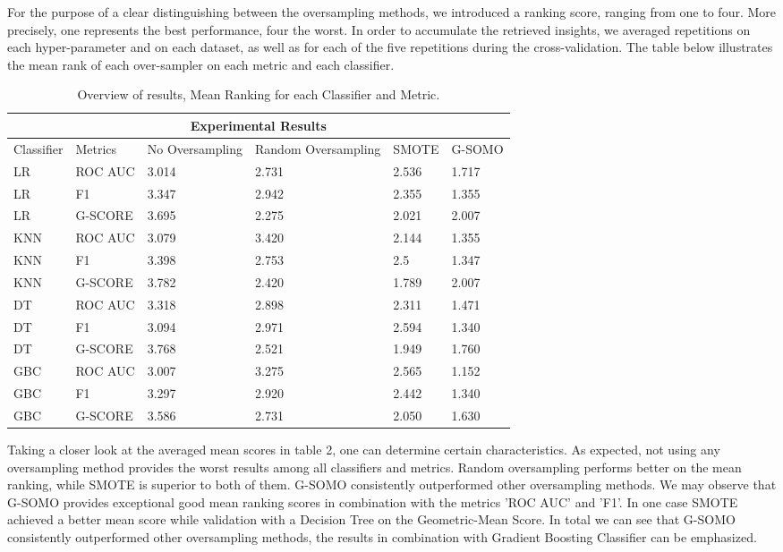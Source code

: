 \documentclass[parskip=full]{scrartcl}
\begin{document}
For the purpose of a clear distinguishing between the oversampling methods, we
introduced a ranking score, ranging from one to four. More precisely, one
represents the best performance, four the worst. In order to accumulate the
retrieved insights, we averaged repetitions on each hyper-parameter and on each
dataset, as well as for each of the five repetitions during the
cross-validation. The table below illustrates the mean rank of each over-sampler
on each metric and each classifier. 

\begin{table} [h]
   \scriptsize
   \centering

\begin{tabular}{ |p{1.4cm}||p{2cm}|p{2cm}|p{2cm}|p{2cm}|p{2cm}|  }  
 \hline
 \multicolumn{6}{|c|}{Experimental Results} \\
 \hline
 Classifier & Metrics & No Oversampling & Random Oversampling & SMOTE & G-SOMO \\
 \hline
 
LR&	ROC AUC&	3.014&	2.731&	2.536&	1.717\\
LR&	F1&	3.347&	2.942&	2.355&	1.355\\
LR&	G-SCORE&	3.695&	2.275&	2.021&	2.007\\
KNN&	ROC AUC&	3.079&	3.420&	2.144&	1.355\\
KNN&	F1&	3.398&	2.753&	2.5&	1.347\\
KNN&	G-SCORE&	3.782&	2.420&	1.789&	2.007\\
DT&	ROC AUC&	3.318&	2.898&	2.311&	1.471\\
DT&	F1&	3.094&	2.971&	2.594&	1.340\\
DT&	G-SCORE&	3.768&	2.521&	1.949&	1.760\\
GBC&	ROC AUC&	3.007&	3.275&	2.565&	1.152\\
GBC&	F1&	3.297&	2.920&	2.442&	1.340\\
GBC&	G-SCORE&	3.586&	2.731&	2.050&	1.630\\

 \hline
\end{tabular}

\caption{Overview of results, Mean Ranking for each Classifier and Metric.}
   \label{tab:test}
\end{table} 

Taking a closer look at the averaged mean scores in table 2, one can determine
certain characteristics. As expected, not using any oversampling method provides
the worst results among all classifiers and metrics. Random oversampling
performs better on the mean ranking, while SMOTE is superior to both of them.
G-SOMO consistently outperformed other oversampling methods. We may observe that
G-SOMO provides exceptional good mean ranking scores in combination with the
metrics 'ROC AUC' and 'F1'. In one case SMOTE achieved a better mean score while
validation with a Decision Tree on the Geometric-Mean Score. In total we can see
that G-SOMO consistently outperformed other oversampling methods, the results in
combination with Gradient Boosting Classifier can be emphasized. 
\end{document}
